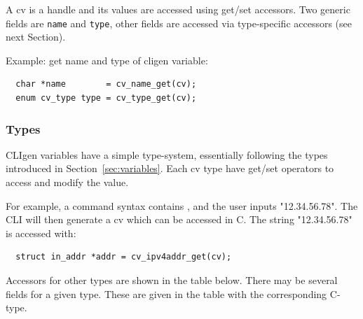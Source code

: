 \documentclass[a4paper, 10pt] {article}
\begin{document}
A cv is a handle and its values are accessed using get/set
accessors. Two generic fields are {\tt name} and {\tt type}, other
fields are accessed via type-specific accessors (see next Section).

Example: get name and type of cligen variable:
\begin{verbatim}
  char *name        = cv_name_get(cv);
  enum cv_type type = cv_type_get(cv);
\end{verbatim}

\subsubsection{Types}

CLIgen variables have a simple type-system, essentially following the
types introduced in Section~\ref{sec:variables}. Each cv type
have get/set operators to access and modify the value.

For example, a command syntax contains {\tt <addr:ipv4addr>}, and
the user inputs "12.34.56.78". The CLI will then generate a cv which
can be accessed in C. The string
"12.34.56.78" is accessed with:
\begin{verbatim}
  struct in_addr *addr = cv_ipv4addr_get(cv);
\end{verbatim}

Accessors for other types are shown in the table
below. There may be several fields for a given type. These are given
in the table with the corresponding C-type.
\end{document}
